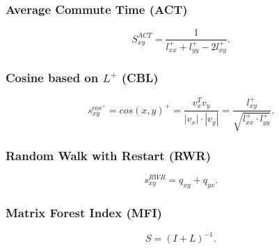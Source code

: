 \documentclass{llncs}
\begin{document}
\subsubsection{Average Commute Time (ACT)}
%
$$S_{xy}^{ACT} = \frac{1}{l_{xx}^{+} + l_{yy}^{+} - 2l_{xy}^{+}}.$$
%
\subsubsection{Cosine based on $L^+$ (CBL)}
%
$$s_{xy}^{cos^{+}} = cos(x, y)^{+} = \frac{v_x^T v_y}{|v_x| \cdot |v_y|} = \frac{l_{xy}^{+}}{\sqrt{l_{xx}^{+}\cdot l_{yy}^{+}}}.$$
%
\subsubsection{Random Walk with Restart (RWR)}
%
$$s_{xy}^{RWR} = q_{xy} + q_{yx}.$$
%
\subsubsection{Matrix Forest Index (MFI)}
%
$$S = (I + L)^{-1}.$$
%
\end{document}
